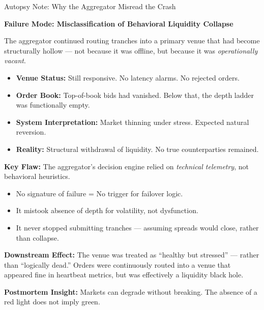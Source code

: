 \begin{TechnicalSidebar}{Autopsy Note: Why the Aggregator Misread the Crash}

  \textbf{Failure Mode: Misclassification of Behavioral Liquidity Collapse}

  \medskip
  
  The aggregator continued routing tranches into a primary venue that had become structurally hollow — not because 
  it was offline, but because it was \emph{operationally vacant}.

  \medskip
  
  \begin{itemize}
    \item \textbf{Venue Status:} Still responsive. No latency alarms. No rejected orders.
    \item \textbf{Order Book:} Top-of-book bids had vanished. Below that, the depth ladder was functionally empty.
    \item \textbf{System Interpretation:} Market thinning under stress. Expected natural reversion.
    \item \textbf{Reality:} Structural withdrawal of liquidity. No true counterparties remained.
  \end{itemize}
  
  \vspace{0.5em}
  
  \textbf{Key Flaw:} The aggregator's decision engine relied on \emph{technical telemetry}, not behavioral heuristics.
  
  \begin{itemize}
    \item No signature of failure = No trigger for failover logic.
    \item It mistook absence of depth for volatility, not dysfunction.
    \item It never stopped submitting tranches — assuming spreads would close, rather than collapse.
  \end{itemize}
  
  \vspace{0.5em}
  
  \textbf{Downstream Effect:} The venue was treated as “healthy but stressed” — rather than “logically dead.” Orders 
  were continuously routed into a venue that appeared fine in heartbeat metrics, but was effectively a liquidity 
  black hole.
  
  \vspace{0.5em}
  
  \textbf{Postmortem Insight:} Markets can degrade without breaking. The absence of a red light does not imply green.
  
\end{TechnicalSidebar}
  





